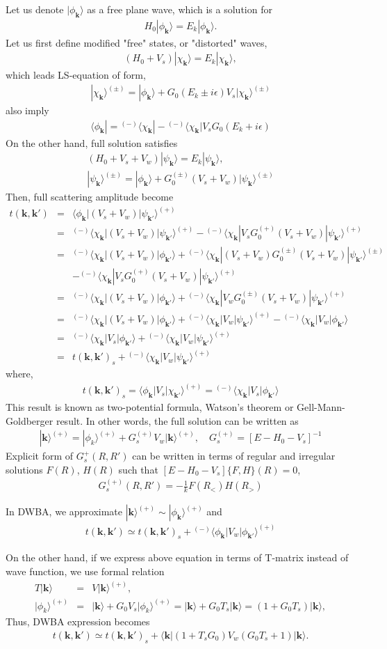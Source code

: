 \documentclass[10pt]{book}
\def\bm{\boldsymbol}
\newcommand{\bea}{\begin{eqnarray}}
\newcommand{\eea}{\end{eqnarray}}
\newcommand{\no}{\nonumber \\}
\def\vk{{\bm k}}
\def\la{\langle}
\def\ra{\rangle}
\begin{document}
Let us denote $|\phi_\vk\ra$ as a free plane wave, which is a solution for
\bea 
H_0|\phi_\vk\ra=E_k|\phi_\vk\ra. 
\eea 
Let us first define modified "free" states, or "distorted" waves, 
\bea
(H_0+V_{s})|\chi_{\vk}\ra=E_{k}|\chi_{\vk}\ra,
\eea
which leads LS-equation of form,
\bea
|\chi_\vk\ra^{(\pm)}
=|\phi_\vk\ra+G_0(E_k \pm i\epsilon) V_{s}|\chi_\vk\ra^{(\pm)}
\eea
also imply
\bea
\la \phi_\vk|={}^{(-)}\la\chi_\vk|
      -{}^{(-)}\la\chi_\vk| V_s G_0(E_k +i\epsilon)
\eea    
On the other hand, full solution satisfies
\bea 
(H_0+V_s+V_w)|\psi_{\vk}\ra= E_k|\psi_{\vk}\ra,\no 
|\psi_{\vk}\ra^{(\pm)}=|\phi_{\vk}\ra+G_0^{(\pm)}(V_s+V_w)|\psi_{\vk}\ra^{(\pm)}     
\eea 
Then, full scattering amplitude become
\bea
t(\vk,\vk')&=&\la \phi_\vk|(V_s+V_w)|\psi_{\vk'}\ra^{(+)} \no 
 &=& {}^{(-)}\la \chi_\vk|(V_s+V_w)|\psi_{\vk'}\ra^{(+)}
 -{}^{(-)}\la \chi_\vk| V_s G_0^{(+)} (V_s+V_w)|\psi_{\vk'}\ra^{(+)}\no
&=&{}^{(-)}\la \chi_\vk|(V_s+V_w) |\phi_{\vk'}\ra +
  {}^{(-)}\la \chi_\vk|(V_s+V_w)G_0^{(\pm)}(V_s+V_w)|\psi_{\vk'}\ra^{(\pm)}
  \no & &
-{}^{(-)}\la \chi_\vk| V_s G_0^{(+)} (V_s+V_w)|\psi_{\vk'}\ra^{(+)}\no 
&=&{}^{(-)}\la \chi_\vk|(V_s+V_w) |\phi_{\vk'}\ra +
  {}^{(-)}\la \chi_\vk|V_w G_0^{(\pm)}(V_s+V_w)|\psi_{\vk'}\ra^{(+)}\no 
&=& {}^{(-)}\la \chi_\vk|(V_s+V_w) |\phi_{\vk'}\ra +
  {}^{(-)}\la \chi_\vk|V_w |\psi_{\vk'}\ra^{(+)}
  -{}^{(-)}\la \chi_\vk|V_w |\phi_{\vk'}\ra
  \no
&=&{}^{(-)}\la \chi_\vk|V_s |\phi_{\vk'}\ra +
  {}^{(-)}\la \chi_\vk|V_w |\psi_{\vk'}\ra^{(+)} \no 
&=& t(\vk,\vk')_s+{}^{(-)}\la \chi_\vk| V_w|\psi_{\vk'}\ra^{(+)}
\eea
where,
\bea 
t(\vk,\vk')_s=\la \phi_\vk|V_s|\chi_{\vk'}\ra^{(+)} = {}^{(-)}\la \chi_\vk|V_s |\phi_{\vk'}\ra
\eea 
This result is known as two-potential formula, Watson's theorem or
Gell-Mann-Goldberger result. In other words, the full solution can be written as
\bea 
|\vk\ra^{(+)}=|\phi_k\ra^{(+)}+G_s^{(+)} V_w|\vk\ra^{(+)},\quad
G_s^{(+)}=[E-H_0-V_s]^{-1}
\eea 
Explicit form of $G_s^{+}(R,R')$ can be written in terms of 
regular and irregular solutions $F(R)$, $H(R)$ such that 
$[E-H_0-V_s]\{F,H\}(R)=0$,
\bea 
G_{s}^{(+)}(R,R')=-\frac{1}{k} F(R_{<})H(R_{>})
\eea 


In DWBA, we approximate $|\vk\ra^{(+)}\sim |\phi_\vk\ra^{(+)}$ and
\bea
t(\vk,\vk')\simeq t(\vk,\vk')_s+{}^{(-)}\la\phi_\vk| V_w|\phi_{\vk'}\ra^{(+)}
\eea

On the other hand, if we express above equation in terms of T-matrix instead
of wave function, we use formal relation
\bea 
T|\vk\ra&=&V|\vk\ra^{(+)},\no 
|\phi_k\ra^{(+)}&=&|\vk\ra+G_0 V_s|\phi_k\ra^{(+)}
                 =|\vk\ra+G_0 T_s|\vk\ra =(1+ G_0 T_s)|\vk\ra,  
\eea 
Thus, DWBA expression becomes
\bea 
t(\vk,\vk')\simeq t(\vk,\vk')_s+\la \vk| (1+T_s G_0) V_w (G_0 T_s+1)|\vk\ra. 
\eea 
\end{document}
